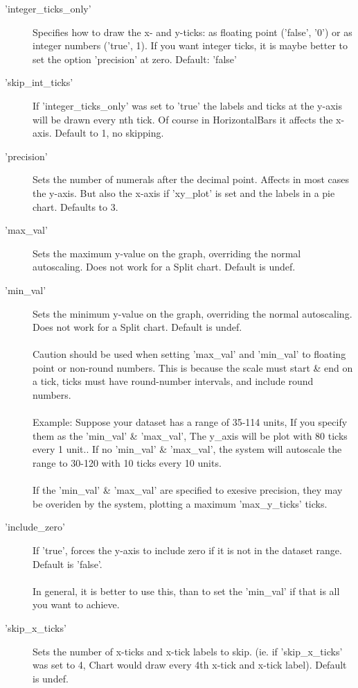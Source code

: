 \begin{description}
\item['integer\_ticks\_only']Specifies how to draw the x- and y-ticks: 
      as floating point ('false', '0') 
      or as integer numbers ('true', 1). 
      If you want integer ticks, it is maybe better to set the option 'precision' at zero. 
      Default: 'false'

\item['skip\_int\_ticks']If 'integer\_ticks\_only' was set to 'true' the labels and 
          ticks at the y-axis will be drawn every nth tick. 
          Of course in HorizontalBars it affects the x-axis. Default to 1, no skipping.

\item['precision'] Sets the number of numerals after the decimal point. 
             Affects in most cases the y-axis. 
             But also the x-axis if 'xy\_plot' is set and the labels in a pie chart. Defaults to 3.

\item['max\_val']Sets the maximum y-value on the graph, overriding the normal autoscaling.  
            Does not work for a Split chart. Default is undef.

\item['min\_val']Sets the minimum y-value on the graph, overriding the normal autoscaling.  
           Does not work for a Split chart. Default is undef.\\
\\
Caution should be used when setting 'max\_val' and 'min\_val' to floating point or non-round numbers. This is because the scale must start \& end on a tick, ticks must have round-number intervals, and include round numbers.\\
\\
Example: Suppose your dataset has a range of 35-114 units, If you specify them as the 'min\_val' \& 'max\_val', The y\_axis will be plot with 80 ticks every 1 unit.. If no 'min\_val' \& 'max\_val', the system will autoscale the range to 30-120 with 10 ticks every 10 units.\\
\\
If the 'min\_val' \& 'max\_val' are specified to exesive precision, they may be overiden by the system, plotting a maximum 'max\_y\_ticks' ticks. 

\item['include\_zero']If 'true', forces the y-axis to include zero if it is not in the 
            dataset range. Default is 'false'.\\
\\
In general, it is better to use this, than to set the 'min\_val' if that is all you want to achieve.
\item['skip\_x\_ticks']Sets the number of x-ticks and x-tick labels to skip.  (ie. if 'skip\_x\_ticks' was set to 4, Chart would draw every 4th x-tick and x-tick label).  Default is undef.


\end{description}
